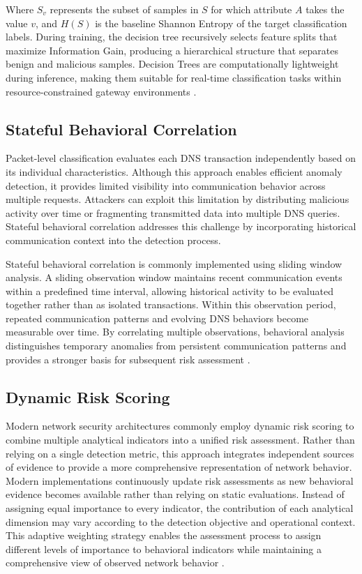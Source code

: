 \documentclass[14pt, a4paper, oneside]{report}
\begin{document}
Where $S_v$ represents the subset of samples in $S$ for which attribute $A$ takes the value $v$, and $H(S)$ is the baseline Shannon Entropy of the target classification labels. During training, the decision tree recursively selects feature splits that maximize Information Gain, producing a hierarchical structure that separates benign and malicious samples. Decision Trees are computationally lightweight during inference, making them suitable for real-time classification tasks within resource-constrained gateway environments \cite{quinlan1986}.

\subsection{Stateful Behavioral Correlation}
Packet-level classification evaluates each DNS transaction independently based on its individual characteristics. Although this approach enables efficient anomaly detection, it provides limited visibility into communication behavior across multiple requests. Attackers can exploit this limitation by distributing malicious activity over time or fragmenting transmitted data into multiple DNS queries. Stateful behavioral correlation addresses this challenge by incorporating historical communication context into the detection process.

Stateful behavioral correlation is commonly implemented using sliding window analysis. A sliding observation window maintains recent communication events within a predefined time interval, allowing historical activity to be evaluated together rather than as isolated transactions. Within this observation period, repeated communication patterns and evolving DNS behaviors become measurable over time. By correlating multiple observations, behavioral analysis distinguishes temporary anomalies from persistent communication patterns and provides a stronger basis for subsequent risk assessment \cite{salat2023}.


\subsection{Dynamic Risk Scoring}
Modern network security architectures commonly employ dynamic risk scoring to combine multiple analytical indicators into a unified risk assessment. Rather than relying on a single detection metric, this approach integrates independent sources of evidence to provide a more comprehensive representation of network behavior.
Modern implementations continuously update risk assessments as new behavioral evidence becomes available rather than relying on static evaluations. Instead of assigning equal importance to every indicator, the contribution of each analytical dimension may vary according to the detection objective and operational context. This adaptive weighting strategy enables the assessment process to assign different levels of importance to behavioral indicators while maintaining a comprehensive view of observed network behavior \cite{deepwatch_drs}.
\end{document}
